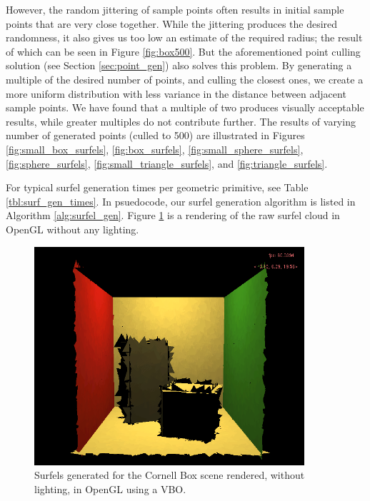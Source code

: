 However, the random jittering of sample points often results in initial sample points that are very close together. While the jittering produces the desired randomness, it also gives us too low an estimate of the required radius; the result of which can be seen in Figure \ref{fig:box500}. But the aforementioned point culling solution (see Section \ref{sec:point_gen}) also solves this problem. By generating a multiple of the desired number of points, and culling the closest ones, we create a more uniform distribution with less variance in the distance between adjacent sample points. We have found that a multiple of two produces visually acceptable results, while greater multiples do not contribute further. The results of varying number of generated points (culled to 500) are illustrated in Figures \ref{fig:small_box_surfels}, \ref{fig:box_surfels}, \ref{fig:small_sphere_surfels}, \ref{fig:sphere_surfels}, \ref{fig:small_triangle_surfels}, and \ref{fig:triangle_surfels}.

For typical surfel generation times per geometric primitive, see Table \ref{tbl:surf_gen_times}. In psuedocode, our surfel generation algorithm is listed in Algorithm \ref{alg:surfel_gen}. Figure \ref{fig:surfel_cloud_simple} is a rendering of the raw surfel cloud in OpenGL without any lighting.

\begin{figure}
   \centering
   \includegraphics[width=100mm]{../img/surfel_cloud_simple.png}
   \captionfonts
   \caption[OpenGL Cornell Box surfel cloud]{Surfels generated for the Cornell Box scene rendered, without lighting, in OpenGL using a VBO.}
   \label{fig:surfel_cloud_simple}
\end{figure}

